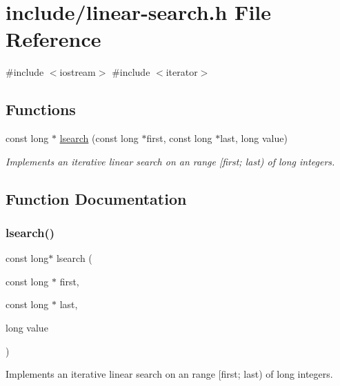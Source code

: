 \hypertarget{linear-search_8h}{}\section{include/linear-\/search.h File Reference}
\label{linear-search_8h}
{\ttfamily \#include $<$iostream$>$}\newline
{\ttfamily \#include $<$iterator$>$}\newline
\subsection*{Functions}
\begin{DoxyCompactItemize}
\item 
const long $\ast$ \mbox{\hyperlink{linear-search_8h_ad6bd0579112962baef5fde208a511e08}{lsearch}} (const long $\ast$first, const long $\ast$last, long value)
\begin{DoxyCompactList}\small\item\em Implements an iterative linear search on an range \mbox{[}first; last) of long integers. \end{DoxyCompactList}\end{DoxyCompactItemize}


\subsection{Function Documentation}
\mbox{\label{linear-search_8h_ad6bd0579112962baef5fde208a511e08}} 
\subsubsection{\texorpdfstring{lsearch()}{lsearch()}}
{\footnotesize\ttfamily const long$\ast$ lsearch (\begin{DoxyParamCaption}\item[{const long $\ast$}]{first,  }\item[{const long $\ast$}]{last,  }\item[{long}]{value }\end{DoxyParamCaption})}



Implements an iterative linear search on an range \mbox{[}first; last) of long integers. 



